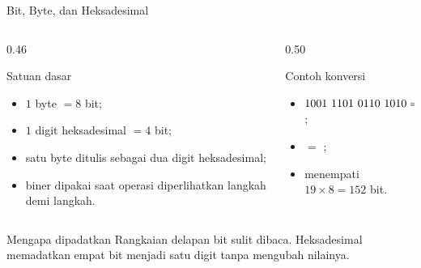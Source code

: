 \documentclass[aspectratio=169,11pt]{beamer}
\begin{document}
\begin{frame}{Bit, Byte, dan Heksadesimal}
    \footnotesize
    \begin{columns}[T,onlytextwidth]
        \begin{column}{0.46\textwidth}
            \begin{block}{Satuan dasar}
                \begin{itemize}
                    \item $1$ byte $=8$ bit;
                    \item $1$ digit heksadesimal $=4$ bit;
                    \item satu byte ditulis sebagai dua digit heksadesimal;
                    \item biner dipakai saat operasi diperlihatkan langkah
                          demi langkah.
                \end{itemize}
            \end{block}
        \end{column}
        \begin{column}{0.50\textwidth}
            \begin{block}{Contoh konversi}
                \begin{itemize}
                    \item $1001\ 1101\ 0110\ 1010=\code{9D6A}$;
                    \item {} $=$
                          ;
                    \item {} menempati
                          $19\times 8=152$ bit.
                \end{itemize}
            \end{block}
        \end{column}
    \end{columns}
    \vspace{0.15cm}
    \begin{exampleblock}{Mengapa dipadatkan}
        Rangkaian delapan bit sulit dibaca. Heksadesimal memadatkan empat
        bit menjadi satu digit tanpa mengubah nilainya.
    \end{exampleblock}
\end{frame}
\end{document}
